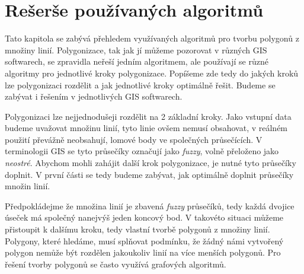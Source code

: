 \chapter{Rešerše používaných algoritmů}
\label{chap:reserzepouzivanychalgoritmu}
	Tato kapitola se zabývá přehledem využívaných algoritmů pro tvorbu polygonů z množiny linií. Polygonizace, tak jak jí můžeme pozorovat v různých GIS softwarech, se zpravidla neřeší jedním algoritmem, ale používají se různé algoritmy pro jednotlivé kroky polygonizace. Popíšeme zde tedy do jakých kroků lze polygonizaci rozdělit a jak jednotlivé kroky optimálně řešit. Budeme se zabývat i řešením v jednotlivých GIS softwarech.

	Polygonizaci lze nejjednodušeji rozdělit na 2 základní kroky. Jako vstupní data budeme uvažovat množinu linií, tyto linie ovšem nemusí obsahovat, v reálném použití převážně neobsahují, lomové body ve společných průsečících. V terminologii GIS se tyto průsečíky označují jako \textit{fuzzy}, volně přeloženo jako \textit{neostré}. Abychom mohli zahájit další krok polygonizace, je nutné tyto průsečíky doplnit. V první části se tedy budeme zabývat, jak optimálně doplnit průsečíky množin linií.
	
	Předpokládejme že množina linií je zbavená \textit{fuzzy} průsečíků, tedy každá dvojice úseček má společný nanejvýš jeden koncový bod. V takovéto situaci můžeme přistoupit k dalšímu kroku, tedy vlastní tvorbě polygonů z množiny linií. Polygony, které hledáme, musí splňovat podmínku, že žádný námi vytvořený polygon nemůže být rozdělen jakoukoliv linií na více menších polygonů. Pro řešení tvorby polygonů se často využívá grafových algoritmů.
	
